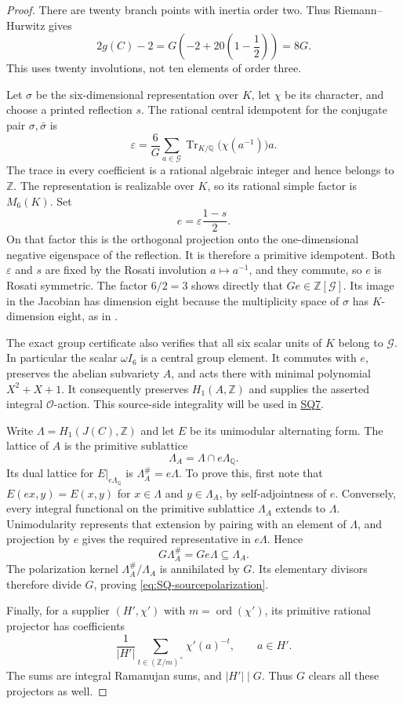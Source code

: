 \documentclass[11pt,a4paper]{article}
\theoremstyle{definition}\newtheorem{definition}[theorem]{Definition}
\theoremstyle{remark}\newtheorem{remark}[theorem]{Remark}
\newcommand{\Q}{\mathbb Q}\newcommand{\Z}{\mathbb Z}\newcommand{\C}{\mathbb C}\newcommand{\R}{\mathbb R}
\newcommand{\cO}{\mathcal O}\newcommand{\CH}{\operatorname{CH}}\newcommand{\cl}{\operatorname{cl}}
\newcommand{\findingref}[1]{\hyperref[#1]{\textsf{#1}}}
\begin{document}
\begin{proof}
There are twenty branch points with inertia order two. Thus Riemann--Hurwitz gives
\[
 2g(C)-2=G\left(-2+20\left(1-\frac12\right)\right)=8G.
\]
This uses twenty involutions, not ten elements of order three.

Let $\sigma$ be the six-dimensional representation over $K$, let $\chi$ be its character, and choose a printed reflection $s$. The rational central idempotent for the conjugate pair $\sigma,\bar\sigma$ is
\[
 \varepsilon=\frac6G\sum_{a\in\mathcal G}
       \operatorname{Tr}_{K/\Q}\bigl(\chi(a^{-1})\bigr)a.
\]
The trace in every coefficient is a rational algebraic integer and hence belongs to $\Z$. The representation is realizable over $K$, so its rational simple factor is $M_6(K)$. Set
\[
 e=\varepsilon\frac{1-s}{2}.
\]
On that factor this is the orthogonal projection onto the one-dimensional negative eigenspace of the reflection. It is therefore a primitive idempotent. Both $\varepsilon$ and $s$ are fixed by the Rosati involution $a\mapsto a^{-1}$, and they commute, so $e$ is Rosati symmetric. The factor $6/2=3$ shows directly that $Ge\in\Z[\mathcal G]$. Its image in the Jacobian has dimension eight because the multiplicity space of $\sigma$ has $K$-dimension eight, as in \citet[Section~3, Definition \texttt{def:pt} and Lemma \texttt{lem:weiltype}]{Severn26}.

The exact group certificate also verifies that all six scalar units of $K$ belong to $\mathcal G$. In particular the scalar $\omega I_6$ is a central group element. It commutes with $e$, preserves the abelian subvariety $A$, and acts there with minimal polynomial $X^2+X+1$. It consequently preserves $H_1(A,\Z)$ and supplies the asserted integral $\cO$-action. This source-side integrality will be used in \findingref{SQ7}.

Write $\Lambda=H_1(J(C),\Z)$ and let $E$ be its unimodular alternating form. The lattice of $A$ is the primitive sublattice
\[
 \Lambda_A=\Lambda\cap e\Lambda_\Q.
\]
Its dual lattice for $E|_{e\Lambda_\Q}$ is $\Lambda_A^\#=e\Lambda$. To prove this, first note that $E(ex,y)=E(x,y)$ for $x\in\Lambda$ and $y\in\Lambda_A$, by self-adjointness of $e$. Conversely, every integral functional on the primitive sublattice $\Lambda_A$ extends to $\Lambda$. Unimodularity represents that extension by pairing with an element of $\Lambda$, and projection by $e$ gives the required representative in $e\Lambda$. Hence
\[
 G\Lambda_A^\#=Ge\Lambda\subseteq\Lambda_A.
\]
The polarization kernel $\Lambda_A^\#/\Lambda_A$ is annihilated by $G$. Its elementary divisors therefore divide $G$, proving \eqref{eq:SQ-sourcepolarization}.

Finally, for a supplier $(H',\chi')$ with $m=\operatorname{ord}(\chi')$, its primitive rational projector has coefficients
\[
 \frac1{|H'|}\sum_{t\in(\Z/m)^\times}\chi'(a)^{-t},\qquad a\in H'.
\]
The sums are integral Ramanujan sums, and $|H'|\mid G$. Thus $G$ clears all these projectors as well.
\end{proof}
\end{document}
